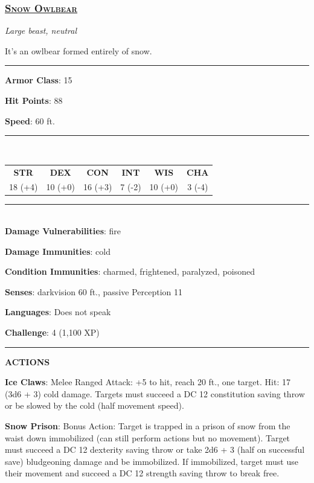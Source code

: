 \subsubsection*{\underline{\textsc{\Large Snow Owlbear}}}
\noindent\emph{Large beast, neutral}

It's an owlbear formed entirely of snow.

\noindent\rule{0.5\textwidth}{0.5pt}

\noindent\textbf{Armor Class}: 15

\noindent\textbf{Hit Points}: 88

\noindent\textbf{Speed}: 60 ft.

\noindent\rule{0.5\textwidth}{0.5pt} \\
\begin{table}[H]
	\begin{tabular}{cccccc}
		\textbf{STR} & \textbf{DEX} & \textbf{CON} & \textbf{INT} & \textbf{WIS} & \textbf{CHA} \\
		18 (+4) & 10 (+0) & 16 (+3) & 7 (-2) & 10 (+0) & 3 (-4) \\
	\end{tabular}
\end{table}
\noindent\rule{0.5\textwidth}{0.5pt} \\

\noindent\textbf{Damage Vulnerabilities}: fire

\noindent\textbf{Damage Immunities}: cold

\noindent\textbf{Condition Immunities}: charmed, frightened, paralyzed, poisoned

\noindent\textbf{Senses}: darkvision 60 ft., passive Perception 11

\noindent\textbf{Languages}: Does not speak

\noindent\textbf{Challenge}: 4 (1,100 XP)

\noindent\rule{0.5\textwidth}{0.5pt}

\noindent\textbf{ACTIONS}

\noindent\textbf{Ice Claws}: Melee Ranged Attack: +5 to hit, reach 20 ft., one target. Hit: 17 (3d6 + 3) cold damage. Targets must succeed a DC 12 constitution saving throw or be slowed by the cold (half movement speed).

\noindent\textbf{Snow Prison}: Bonus Action: Target is trapped in a prison of snow from the waist down immobilized (can still perform actions but no movement). Target must succeed a DC 12 dexterity saving throw or take 2d6 + 3 (half on successful save) bludgeoning damage and be immobilized. If immobilized, target must use their movement and succeed a DC 12 strength saving throw to break free.

